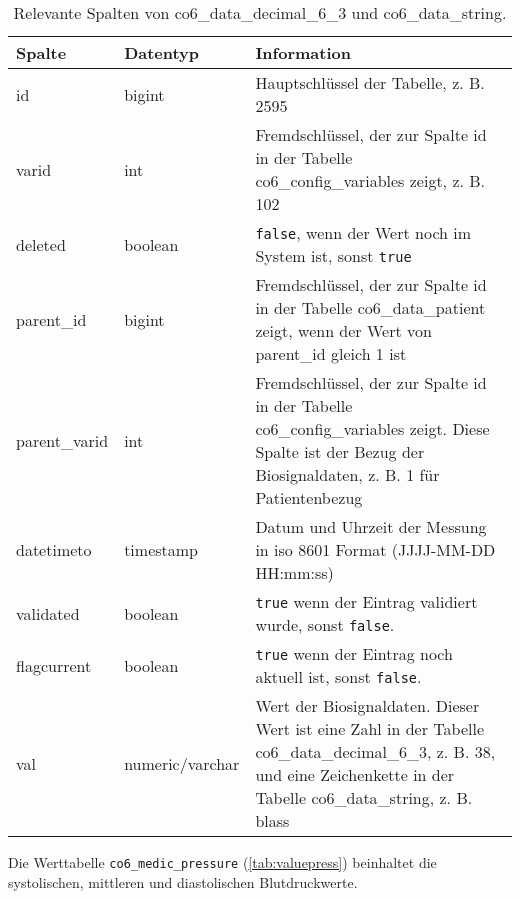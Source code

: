 \begin{longtable}{|l|l|p{7cm}|}
	\caption[Relevante Spalten von co6\_data\_decimal\_6\_3 und \\ co6\_data\_string]{Relevante Spalten von co6\_data\_decimal\_6\_3 und co6\_data\_string.}
	\label{tab:valuetab}
	\endfirsthead
		\hline
		\bfseries Spalte & \bfseries Datentyp & \bfseries Information \\ \hline
		id & bigint & Hauptschlüssel der Tabelle, z. B. 2595 \\ \hline
		varid & int & Fremdschlüssel, der zur Spalte id in der Tabelle co6\_config\_variables zeigt, z. B. 102 \\ \hline
		deleted & boolean & \texttt{false}, wenn der Wert noch im System ist, sonst \texttt{true} \\ \hline
		parent\_id & bigint & Fremdschlüssel, der zur Spalte id in der Tabelle co6\_data\_patient zeigt, wenn der Wert von parent\_id gleich 1 ist \\ \hline
		parent\_varid & int & Fremdschlüssel, der zur Spalte id in der Tabelle co6\_config\_variables zeigt. Diese Spalte ist der Bezug der Biosignaldaten, z. B. 1 für Patientenbezug \\ \hline
		datetimeto & timestamp & Datum und Uhrzeit der Messung in \acs{iso} 8601 Format (JJJJ-MM-DD HH:mm:ss)\\ \hline
		validated & boolean & \texttt{true} wenn der Eintrag validiert wurde, sonst \texttt{false}. \\ \hline
		flagcurrent & boolean & \texttt{true} wenn der Eintrag noch aktuell ist, sonst \texttt{false}. \\ \hline
		val & numeric/varchar & Wert der Biosignaldaten. Dieser Wert ist eine Zahl in der Tabelle co6\_data\_decimal\_6\_3, z. B. 38, und eine Zeichenkette in der Tabelle co6\_data\_string, z. B. blass \\ \hline
\end{longtable}

Die Werttabelle \texttt{co6\_medic\_pressure} (\ref{tab:valuepress}) beinhaltet die systolischen, mittleren und diastolischen Blutdruckwerte.

